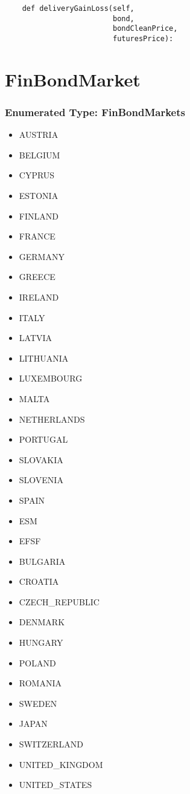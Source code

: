 \documentclass[twoside,11pt]{book}
\begin{document}
\begin{lstlisting}
    def deliveryGainLoss(self,
                         bond,
                         bondCleanPrice,
                         futuresPrice):
\end{lstlisting}

\newpage
\section{FinBondMarket}

\subsubsection{Enumerated Type: FinBondMarkets}
\begin{itemize}
\item{AUSTRIA}
\item{BELGIUM}
\item{CYPRUS}
\item{ESTONIA}
\item{FINLAND}
\item{FRANCE}
\item{GERMANY}
\item{GREECE}
\item{IRELAND}
\item{ITALY}
\item{LATVIA}
\item{LITHUANIA}
\item{LUXEMBOURG}
\item{MALTA}
\item{NETHERLANDS}
\item{PORTUGAL}
\item{SLOVAKIA}
\item{SLOVENIA}
\item{SPAIN}
\item{ESM}
\item{EFSF}
\item{BULGARIA}
\item{CROATIA}
\item{CZECH\_REPUBLIC}
\item{DENMARK}
\item{HUNGARY}
\item{POLAND}
\item{ROMANIA}
\item{SWEDEN}
\item{JAPAN}
\item{SWITZERLAND}
\item{UNITED\_KINGDOM}
\item{UNITED\_STATES}
\end{itemize}
\end{document}

